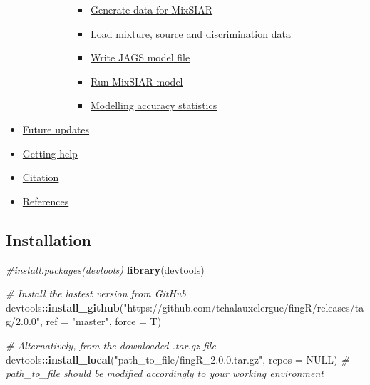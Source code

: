 \documentclass[
]{article}
\newenvironment{Shaded}{\begin{snugshade}}{\end{snugshade}}
\newcommand{\AttributeTok}[1]{\textcolor[rgb]{0.13,0.29,0.53}{#1}}
\newcommand{\CommentTok}[1]{\textcolor[rgb]{0.56,0.35,0.01}{\textit{#1}}}
\newcommand{\ConstantTok}[1]{\textcolor[rgb]{0.56,0.35,0.01}{#1}}
\newcommand{\FunctionTok}[1]{\textcolor[rgb]{0.13,0.29,0.53}{\textbf{#1}}}
\newcommand{\NormalTok}[1]{#1}
\newcommand{\SpecialCharTok}[1]{\textcolor[rgb]{0.81,0.36,0.00}{\textbf{#1}}}
\newcommand{\StringTok}[1]{\textcolor[rgb]{0.31,0.60,0.02}{#1}}
\providecommand{\tightlist}{%
  \setlength{\itemsep}{0pt}\setlength{\parskip}{0pt}}
\begin{document}
\begin{itemize}
\begin{itemize}
\begin{itemize}
\begin{itemize}
        \begin{itemize}
        \tightlist
        \item
          \protect\hyperlink{generate-data-for-mixsiar}{Generate data
          for MixSIAR}
        \item
          \protect\hyperlink{load-mixture-source-and-discrimination-data}{Load
          mixture, source and discrimination data}
        \item
          \protect\hyperlink{write-jags-model-file}{Write JAGS model
          file}
        \item
          \protect\hyperlink{run-mixsiar-model}{Run MixSIAR model}
        \item
          \protect\hyperlink{modelling-accuracy-statistics-1}{Modelling
          accuracy statistics}
        \end{itemize}
      \end{itemize}
    \end{itemize}
  \end{itemize}
\item
  \protect\hyperlink{future-updates}{Future updates}
\item
  \protect\hyperlink{getting-help}{Getting help}
\item
  \protect\hyperlink{citation}{Citation}
\item
  \protect\hyperlink{references}{References}
\end{itemize}

\hypertarget{installation}{%
\subsection{Installation}\label{installation}}

\begin{Shaded}
\begin{Highlighting}[]
\CommentTok{\#install.packages(devtools)}
\FunctionTok{library}\NormalTok{(devtools)}

\CommentTok{\# Install the lastest version from GitHub}
\NormalTok{devtools}\SpecialCharTok{::}\FunctionTok{install\_github}\NormalTok{(}\StringTok{"https://github.com/tchalauxclergue/fingR/releases/tag/2.0.0"}\NormalTok{, }\AttributeTok{ref =} \StringTok{"master"}\NormalTok{, }\AttributeTok{force =}\NormalTok{ T)}

\CommentTok{\# Alternatively, from the downloaded .tar.gz file}
\NormalTok{devtools}\SpecialCharTok{::}\FunctionTok{install\_local}\NormalTok{(}\StringTok{"path\_to\_file/fingR\_2.0.0.tar.gz"}\NormalTok{, }\AttributeTok{repos =} \ConstantTok{NULL}\NormalTok{) }\CommentTok{\# \textquotesingle{}path\_to\_file\textquotesingle{} should be modified accordingly to your working environment}
\end{Highlighting}
\end{Shaded}
\end{document}
